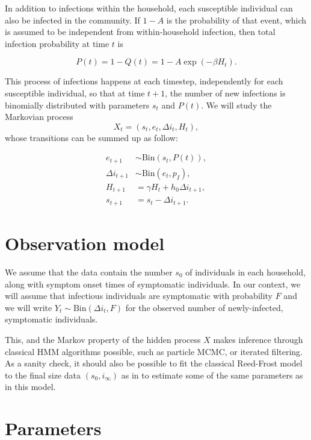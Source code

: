 \documentclass[a4paper]{article}
\begin{document}
In addition to infections within the household, each susceptible individual can
also be infected in the community. If \(1-A\) is the probability of that event,
which is assumed to be independent from within-household infection, then total
infection probability at time \(t\) is 

\[
	P(t)=1-Q(t) = 1-A\exp(-\beta H_t).
\]

This process of infections happens at each timestep, independently for each
susceptible individual, so that at time \(t+1\), the number of new infections is
binomially distributed with parameters \(s_t\) and \(P(t)\). We will study the
Markovian process
\begin{equation}
	X_t=(s_t,e_t,\Delta i_t,H_t),
\end{equation}
whose transitions can be summed up as follow:

\begin{align}
	e_{t+1} & \sim \text{Bin}(s_t,P(t)), \\
	\Delta i_{t+1} & \sim \text{Bin}(e_t,p_I), \\
	H_{t+1} & = \gamma H_t + h_0 \Delta i_{t+1}, \\
	s_{t+1} & = s_t - \Delta i_{t+1}.
\end{align}

\section*{Observation model}

We assume that the data contain the number \(s_0\) of individuals in each
household, along with symptom onset times of symptomatic individuals. In our
context, we will assume that infectious individuals are symptomatic with
probability \(F\) and we will write \(Y_t \sim \text{Bin}(\Delta i_t,F)\) for 
the observed number of newly-infected, symptomatic individuals. 

This, and the Markov property of the hidden process \(X\) makes inference 
through classical HMM algorithms possible, such as particle MCMC, or iterated
filtering. As a sanity check, it should also be possible to fit the classical
Reed-Frost model to the final size data \((s_0,i_\infty)\) as in 
\cite{Cauchemez2014} to
estimate some of the same parameters as in this model.

\section*{Parameters}
\end{document}
